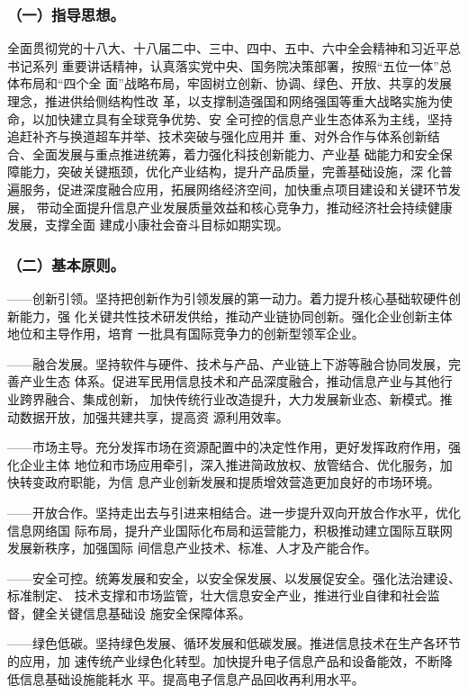 \documentclass[11pt]{ctexart}
\begin{document}
{{{{\subsubsection{（一）指导思想。}
\label{sec:orgebe312b}
全面贯彻党的十八大、十八届二中、三中、四中、五中、六中全会精神和习近平总书记系列
重要讲话精神，认真落实党中央、国务院决策部署，按照“五位一体”总体布局和“四个全
面”战略布局，牢固树立创新、协调、绿色、开放、共享的发展理念，推进供给侧结构性改
革，以支撑制造强国和网络强国等重大战略实施为使命，以加快建立具有全球竞争优势、安
全可控的信息产业生态体系为主线，坚持追赶补齐与换道超车并举、技术突破与强化应用并
重、对外合作与体系创新结合、全面发展与重点推进统筹，着力强化科技创新能力、产业基
础能力和安全保障能力，突破关键瓶颈，优化产业结构，提升产品质量，完善基础设施，深
化普遍服务，促进深度融合应用，拓展网络经济空间，加快重点项目建设和关键环节发展，
带动全面提升信息产业发展质量效益和核心竞争力，推动经济社会持续健康发展，支撑全面
建成小康社会奋斗目标如期实现。

\subsubsection{（二）基本原则。}
\label{sec:org21443ba}
——创新引领。坚持把创新作为引领发展的第一动力。着力提升核心基础软硬件创新能力，强
化关键共性技术研发供给，推动产业链协同创新。强化企业创新主体地位和主导作用，培育
一批具有国际竞争力的创新型领军企业。

——融合发展。坚持软件与硬件、技术与产品、产业链上下游等融合协同发展，完善产业生态
体系。促进军民用信息技术和产品深度融合，推动信息产业与其他行业跨界融合、集成创新，
加快传统行业改造提升，大力发展新业态、新模式。推动数据开放，加强共建共享，提高资
源利用效率。

——市场主导。充分发挥市场在资源配置中的决定性作用，更好发挥政府作用，强化企业主体
地位和市场应用牵引，深入推进简政放权、放管结合、优化服务，加快转变政府职能，为信
息产业创新发展和提质增效营造更加良好的市场环境。

——开放合作。坚持走出去与引进来相结合。进一步提升双向开放合作水平，优化信息网络国
际布局，提升产业国际化布局和运营能力，积极推动建立国际互联网发展新秩序，加强国际
间信息产业技术、标准、人才及产能合作。

——安全可控。统筹发展和安全，以安全保发展、以发展促安全。强化法治建设、标准制定、
技术支撑和市场监管，壮大信息安全产业，推进行业自律和社会监督，健全关键信息基础设
施安全保障体系。

——绿色低碳。坚持绿色发展、循环发展和低碳发展。推进信息技术在生产各环节的应用，加
速传统产业绿色化转型。加快提升电子信息产品和设备能效，不断降低信息基础设施能耗水
平。提高电子信息产品回收再利用水平。

}}}}
\end{document}
